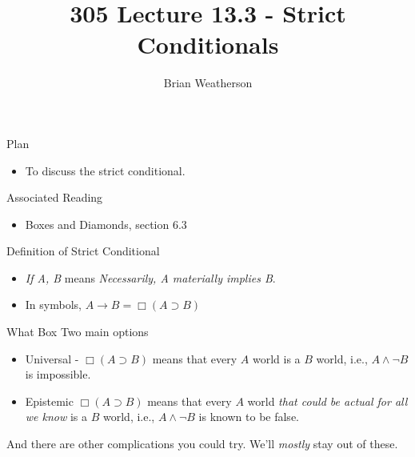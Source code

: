 \documentclass[
  ignorenonframetext,
]{beamer}
\title{305 Lecture 13.3 - Strict Conditionals}
\author{Brian Weatherson}
\date{}
\providecommand{\tightlist}{%
  \setlength{\itemsep}{0pt}\setlength{\parskip}{0pt}}
\renewcommand{\,}{\text{, }}
\begin{document}
\frame{\titlepage}

\begin{frame}{Plan}
\protect\hypertarget{plan}{}
\begin{itemize}
\tightlist
\item
  To discuss the strict conditional.
\end{itemize}
\end{frame}

\begin{frame}{Associated Reading}
\protect\hypertarget{associated-reading}{}
\begin{itemize}
\tightlist
\item
  Boxes and Diamonds, section 6.3
\end{itemize}
\end{frame}

\begin{frame}{Definition of Strict Conditional}
\protect\hypertarget{definition-of-strict-conditional}{}
\begin{itemize}
\tightlist
\item
  \emph{If A, B} means \emph{Necessarily, A materially implies B}.
\item
  In symbols, \(A \rightarrow B = \Box (A \supset B)\)
\end{itemize}
\end{frame}

\begin{frame}{What Box}
\protect\hypertarget{what-box}{}
Two main options

\begin{itemize}
\tightlist
\item
  Universal - \(\Box (A \supset B)\) means that every \(A\) world is a
  \(B\) world, i.e., \(A \wedge \neg B\) is impossible.
\item
  Epistemic \(\Box (A \supset B)\) means that every \(A\) world
  \emph{that could be actual for all we know} is a \(B\) world, i.e.,
  \(A \wedge \neg B\) is known to be false.
\end{itemize}

And there are other complications you could try. We'll \emph{mostly}
stay out of these.
\end{frame}
\end{document}
